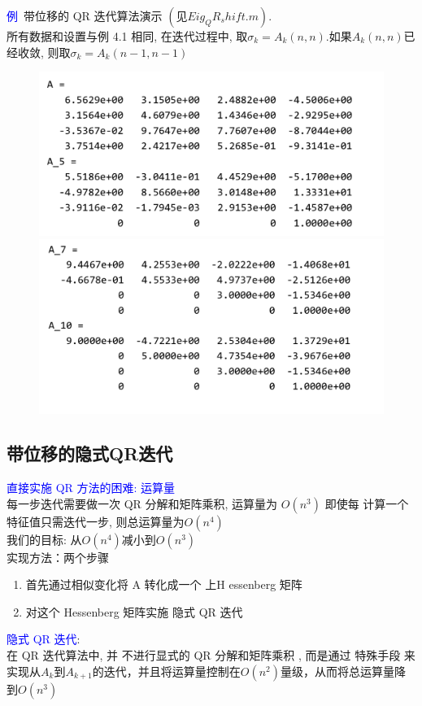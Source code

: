 \documentclass[12pt,a4paper]{article}
\begin{document}
\textcolor{blue}{例}~带位移的 QR 迭代算法演示 $(见 Eig_QR_shift.m).$\\
所有数据和设置与例 4.1 相同, 在迭代过程中, 取$\sigma_{k}=A_{k}(n, n)$.如果$A_{k}(n, n)$已经收敛, 则取$\sigma_{k}=A_{k}(n-1, n-1)$
\begin{figure}
	\begin{center}
		\includegraphics[scale=0.6]{figuresl/figure7.png}
		\includegraphics[scale=0.6]{figuresl/figure8.png}
	\end{center}
\end{figure}
\subsection{带位移的隐式QR迭代}
\noindent \textcolor{blue}{直接实施 QR 方法的困难: 运算量}\\
每一步迭代需要做一次 QR 分解和矩阵乘积, 运算量为 $O\left(n^{3}\right)$ 即使每 计算一个特征值只需迭代一步, 则总运算量为$O\left(n^{4}\right)$\\
我们的目标: 从$O\left(n^{4}\right)$减小到$O\left(n^{3}\right)$\\
实现方法：两个步骤\\
\begin{enumerate}[(1)]
	\item 首先通过相似变化将 A 转化成一个 上H
	essenberg 矩阵
	\item 对这个 Hessenberg 矩阵实施 隐式 QR 迭代
\end{enumerate}
\textcolor{blue}{隐式 QR 迭代}:\\
在 QR 迭代算法中, 并 不进行显式的 QR 分解和矩阵乘积 , 而是通过 特殊手段 来实现从$A_{k}$到$A_{k+1}$的迭代，并且将运算量控制在$O\left(n^{2}\right)$量级，从而将总运算量降到$O(n^{3})$
\end{document}
